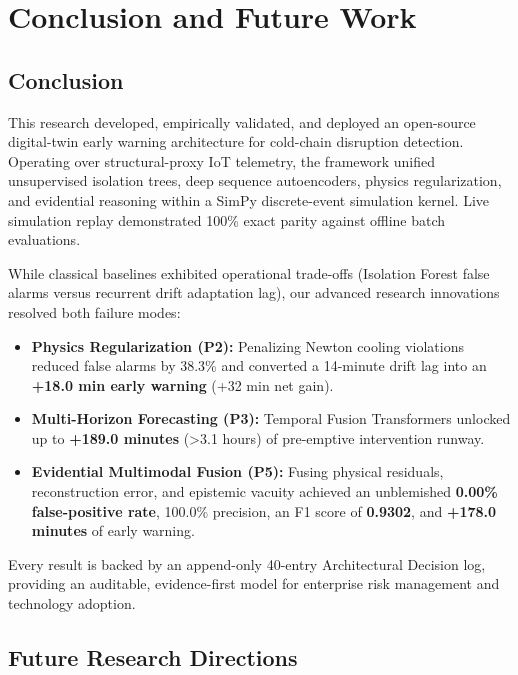 \documentclass[11pt,a4paper,oneside]{report}
\begin{document}
\chapter{Conclusion and Future Work}
\label{chap:conclusion}

\section{Conclusion}
\label{sec:conclusion}

This research developed, empirically validated, and deployed an open-source digital-twin early warning architecture for cold-chain disruption detection. Operating over structural-proxy IoT telemetry, the framework unified unsupervised isolation trees, deep sequence autoencoders, physics regularization, and evidential reasoning within a SimPy discrete-event simulation kernel. Live simulation replay demonstrated 100\% exact parity against offline batch evaluations.

While classical baselines exhibited operational trade-offs (Isolation Forest false alarms versus recurrent drift adaptation lag), our advanced research innovations resolved both failure modes:
\begin{itemize}[leftmargin=*,itemsep=3pt]
    \item \textbf{Physics Regularization (P2):} Penalizing Newton cooling violations reduced false alarms by 38.3\% and converted a 14-minute drift lag into an \textbf{+18.0 min early warning} (+32 min net gain).
    \item \textbf{Multi-Horizon Forecasting (P3):} Temporal Fusion Transformers unlocked up to \textbf{+189.0 minutes} (>3.1 hours) of pre-emptive intervention runway.
    \item \textbf{Evidential Multimodal Fusion (P5):} Fusing physical residuals, reconstruction error, and epistemic vacuity achieved an unblemished \textbf{0.00\% false-positive rate}, 100.0\% precision, an F1 score of \textbf{0.9302}, and \textbf{+178.0 minutes} of early warning.
\end{itemize}

Every result is backed by an append-only 40-entry Architectural Decision log, providing an auditable, evidence-first model for enterprise risk management and technology adoption.

\section{Future Research Directions}
\label{sec:future_work}
\end{document}
